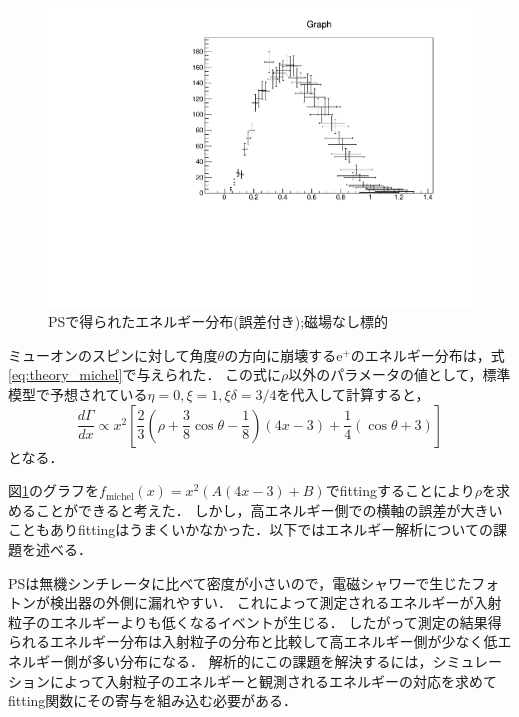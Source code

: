   \begin{figure}[H]
   \centering
   \includegraphics[height = 0.7\columnwidth , angle = -90]{figure/ikemitsu/michel_PS_gosa.pdf}
   \caption{PSで得られたエネルギー分布(誤差付き);磁場なし標的}
   \label{michel_PS_gosa}
  \end{figure}
  
  ミューオンのスピンに対して角度$\theta$の方向に崩壊する$\mathrm{e}^{+}$のエネルギー分布は，式\ref{eq:theory_michel}で与えられた．
  この式に$\rho$以外のパラメータの値として，標準模型で予想されている$\eta = 0 , \xi = 1 , \xi \delta = 3/4$を代入して計算すると，
  \begin{equation*}
   \frac{d\Gamma}{dx} \propto x^{2} [\frac{2}{3}(\rho + \frac{3}{8}\cos \theta - \frac{1}{8})(4x-3) + \frac{1}{4}(\cos \theta + 3)]
  \end{equation*}
  となる．

  図\ref{michel_PS_gosa}のグラフを$f_{\mathrm{michel}}(x) = x^{2} (A(4x -3) + B)$でfittingすることにより$\rho$を求めることができると考えた．
  しかし，高エネルギー側での横軸の誤差が大きいこともありfittingはうまくいかなかった．以下ではエネルギー解析についての課題を述べる．

  PSは無機シンチレータに比べて密度が小さいので，電磁シャワーで生じたフォトンが検出器の外側に漏れやすい．%
  これによって測定されるエネルギーが入射粒子のエネルギーよりも低くなるイベントが生じる．
  したがって測定の結果得られるエネルギー分布は入射粒子の分布と比較して高エネルギー側が少なく低エネルギー側が多い分布になる．
  解析的にこの課題を解決するには，シミュレーションによって入射粒子のエネルギーと観測されるエネルギーの対応を求めてfitting関数にその寄与を組み込む必要がある．

